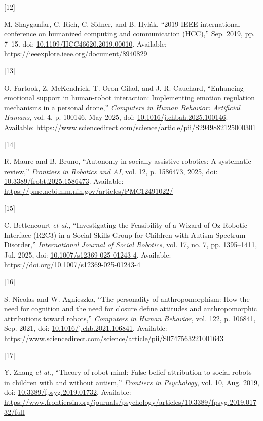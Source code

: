 \documentclass[
  letterpaper,
  DIV=11,
  numbers=noendperiod]{scrartcl}
\newlength{\cslhangindent}
\newlength{\csllabelwidth}
\newenvironment{CSLReferences}[2] %
 {\begin{list}{}{%
  \setlength{\itemindent}{0pt}
  \setlength{\leftmargin}{0pt}
  \setlength{\parsep}{0pt}
  \ifodd #1
   \setlength{\leftmargin}{\cslhangindent}
   \setlength{\itemindent}{-1\cslhangindent}
  \fi
  \setlength{\itemsep}{#2\baselineskip}}}
 {\end{list}}
\newcommand{\CSLLeftMargin}[1]{\parbox[t]{\csllabelwidth}{\strut#1\strut}}
\newcommand{\CSLRightInline}[1]{\parbox[t]{\linewidth - \csllabelwidth}{\strut#1\strut}}
\begin{document}
\begin{CSLReferences}{0}{0}
\CSLLeftMargin{{[}12{]} }%
\CSLRightInline{M. Shayganfar, C. Rich, C. Sidner, and B. Hylák, {``2019
IEEE international conference on humanized computing and communication
(HCC),''} Sep. 2019, pp. 7--15. doi:
\href{https://doi.org/10.1109/HCC46620.2019.00010}{10.1109/HCC46620.2019.00010}.
Available: \url{https://ieeexplore.ieee.org/document/8940829}}

\CSLLeftMargin{{[}13{]} }%
\CSLRightInline{O. Fartook, Z. McKendrick, T. Oron-Gilad, and J. R.
Cauchard, {``Enhancing emotional support in human-robot interaction:
Implementing emotion regulation mechanisms in a personal drone,''}
\emph{Computers in Human Behavior: Artificial Humans}, vol. 4, p.
100146, May 2025, doi:
\href{https://doi.org/10.1016/j.chbah.2025.100146}{10.1016/j.chbah.2025.100146}.
Available:
\url{https://www.sciencedirect.com/science/article/pii/S2949882125000301}}

\CSLLeftMargin{{[}14{]} }%
\CSLRightInline{R. Maure and B. Bruno, {``Autonomy in socially assistive
robotics: A systematic review,''} \emph{Frontiers in Robotics and AI},
vol. 12, p. 1586473, 2025, doi:
\href{https://doi.org/10.3389/frobt.2025.1586473}{10.3389/frobt.2025.1586473}.
Available: \url{https://pmc.ncbi.nlm.nih.gov/articles/PMC12491022/}}

\CSLLeftMargin{{[}15{]} }%
\CSLRightInline{C. Bettencourt \emph{et al.}, {``Investigating the
Feasibility of a Wizard-of-Oz Robotic Interface (R2C3) in a Social
Skills Group for Children with Autism Spectrum Disorder,''}
\emph{International Journal of Social Robotics}, vol. 17, no. 7, pp.
1395--1411, Jul. 2025, doi:
\href{https://doi.org/10.1007/s12369-025-01243-4}{10.1007/s12369-025-01243-4}.
Available: \url{https://doi.org/10.1007/s12369-025-01243-4}}

\CSLLeftMargin{{[}16{]} }%
\CSLRightInline{S. Nicolas and W. Agnieszka, {``The personality of
anthropomorphism: How the need for cognition and the need for closure
define attitudes and anthropomorphic attributions toward robots,''}
\emph{Computers in Human Behavior}, vol. 122, p. 106841, Sep. 2021, doi:
\href{https://doi.org/10.1016/j.chb.2021.106841}{10.1016/j.chb.2021.106841}.
Available:
\url{https://www.sciencedirect.com/science/article/pii/S0747563221001643}}

\CSLLeftMargin{{[}17{]} }%
\CSLRightInline{Y. Zhang \emph{et al.}, {``Theory of robot mind: False
belief attribution to social robots in children with and without
autism,''} \emph{Frontiers in Psychology}, vol. 10, Aug. 2019, doi:
\href{https://doi.org/10.3389/fpsyg.2019.01732}{10.3389/fpsyg.2019.01732}.
Available:
\url{https://www.frontiersin.org/journals/psychology/articles/10.3389/fpsyg.2019.01732/full}}


\end{CSLReferences}
\end{document}
